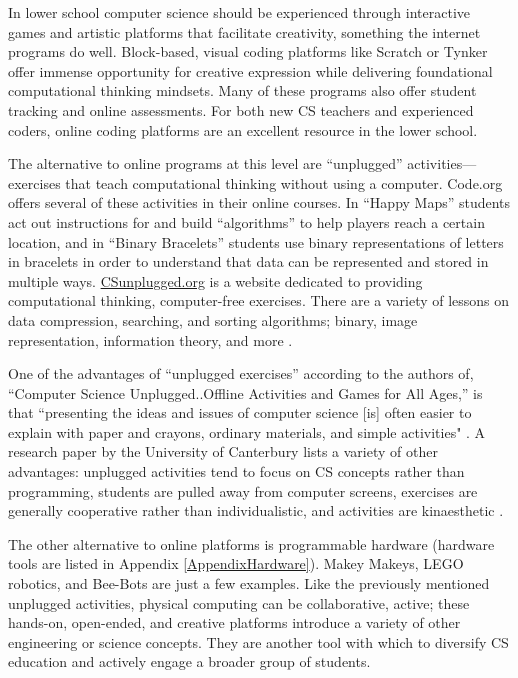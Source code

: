 \label{procononline}
In lower school computer science should be experienced through interactive games and artistic platforms that facilitate creativity, something the internet programs do well. Block-based, visual coding platforms like Scratch or Tynker offer immense opportunity for creative expression while delivering foundational computational thinking mindsets. Many of these programs also offer student tracking and online assessments. For both new CS teachers and experienced coders, online coding platforms are an excellent resource in the lower school.\par
\label{unplugged}The alternative to online programs at this level are ``unplugged'' activities---exercises that teach computational thinking without using a computer. Code.org offers several of these activities in their online courses. In ``Happy Maps'' students act out instructions for and build ``algorithms'' to help players reach a certain location, and in ``Binary Bracelets'' students use binary representations of letters in bracelets in order to understand that data can be represented and stored in multiple ways. \href{http://csunplugged.org/}{CSunplugged.org} is a website dedicated to providing computational thinking, computer-free exercises. There are a variety of lessons on data compression, searching, and sorting algorithms; binary, image representation, information theory, and more \cite{unplug1}.\par
One of the advantages of ``unplugged exercises'' according to the authors of, ``Computer Science Unplugged..Offline Activities and Games for All Ages,'' is that ``presenting the ideas and issues of computer science [is] often easier to explain with paper and crayons, ordinary materials, and simple activities" \cite{unplugbook}. A research paper by the University of Canterbury lists a variety of other advantages: unplugged activities tend to focus on CS concepts rather than programming, students are pulled away from computer screens, exercises are generally cooperative rather than individualistic, and activities are kinaesthetic \cite{unplugart}.\par
The other alternative to online platforms is programmable hardware (hardware tools are listed in Appendix \ref{AppendixHardware}). Makey Makeys, LEGO robotics, and Bee-Bots are just a few examples. Like the previously mentioned unplugged activities, physical computing can be collaborative, active; these hands-on, open-ended, and creative platforms introduce a variety of other engineering or science concepts. They are another tool with which to diversify CS education and actively engage a broader group of students.\par
